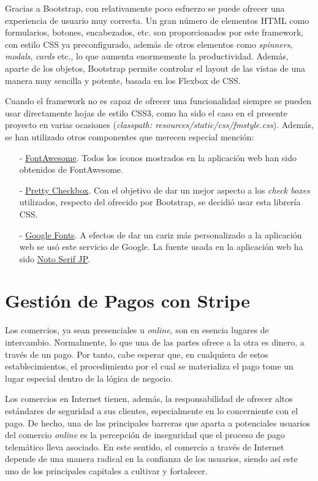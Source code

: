 \documentclass[a4paper,12pt,twoside,openright]{report}
\begin{document}
    Gracias a Bootstrap, con relativamente poco esfuerzo se puede ofrecer una experiencia de usuario muy correcta. Un gran número de elementos HTML como formularios, botones, encabezados, etc. son proporcionados por este framework, con estilo CSS ya preconfigurado, además de otros elementos como \emph{spinners}, \emph{modals}, \emph{cards} etc., lo que aumenta enormemente la productividad.  Además, aparte de los objetos, Bootstrap permite controlar el layout de las vistas de una manera muy sencilla y potente, basada en los Flexbox de CSS.
    
    Cuando el framework no es capaz de ofrecer una funcionalidad siempre se pueden usar directamente hojas de estilo CSS3, como ha sido el caso en el presente proyecto en varias ocasiones (\emph{classpath: resources/static/css/fmstyle.css}). Además, se han utilizado otros componentes que merecen especial mención:
    
    \begin{itemize}
    	\item[-] \href{https://fontawesome.com/}{FontAwesome}. Todos los iconos mostrados en la aplicación web han sido obtenidos de FontAwesome.
    	\item[-] \href{https://lokesh-coder.github.io/pretty-checkbox/}{Pretty Checkbox}. Con el objetivo de dar un mejor aspecto a los \emph{check boxes} utilizados, respecto del ofrecido por Bootstrap, se decidió usar esta librería CSS.
    	\item[-] \href{https://fonts.google.com/}{Google Fonts}. A efectos de dar un cariz más personalizado a la aplicación web se usó este servicio de Google. La fuente usada en la aplicación web ha sido \href{https://fonts.google.com/specimen/Noto+Serif+JP}{Noto Serif JP}.
    \end{itemize}
    
    \section[Pagos con Stripe]{Gestión de Pagos con Stripe} \label{sec:stripe}
    Los comercios, ya sean presenciales u \emph{online}, son en esencia lugares de intercambio. Normalmente, lo que una de las partes ofrece a la otra es dinero, a través de un pago. Por tanto, cabe esperar que, en cualquiera de estos establecimientos, el procedimiento por el cual se materializa el pago tome un lugar especial dentro de la lógica de negocio.
    
    Los comercios en Internet tienen, además, la responsabilidad de ofrecer altos estándares de seguridad a sus clientes, especialmente en lo concerniente con el pago. De hecho, una de las principales barreras que aparta a potenciales usuarios del comercio \emph{online} es la percepción de inseguridad que el proceso de pago telemático lleva asociado. En este sentido, el comercio a través de Internet depende de una manera radical en la confianza de los usuarios, siendo así este uno de los principales capitales a cultivar y fortalecer.
    
\end{document}
